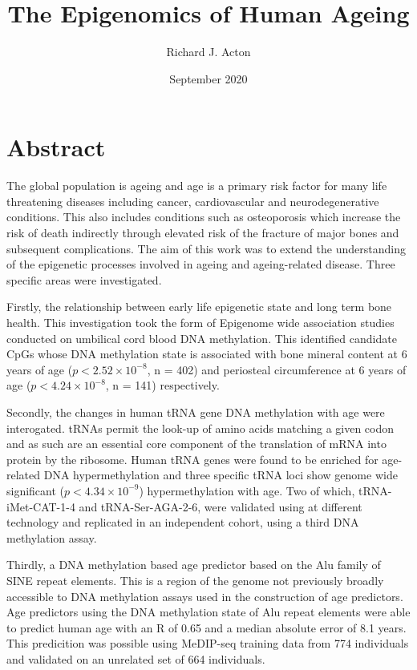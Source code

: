\documentclass[
]{book}
\title{\textbf{The Epigenomics of Human Ageing}}
\subtitle{\emph{\emph{University of Southampton}}

\textbf{Academic Unit:} Human Development and Health

A thesis for the degree of Doctor of Philosophy}
\author{Richard J. Acton}
\date{September 2020}
\begin{document}
\maketitle
\hypertarget{abstract}{%
\section*{Abstract}\label{abstract}}

The global population is ageing and age is a primary risk factor for many life threatening diseases including cancer, cardiovascular and neurodegenerative conditions.
This also includes conditions such as osteoporosis which increase the risk of death indirectly through elevated risk of the fracture of major bones and subsequent complications.
The aim of this work was to extend the understanding of the epigenetic processes involved in ageing and ageing-related disease.
Three specific areas were investigated.

Firstly, the relationship between early life epigenetic state and long term bone health.
This investigation took the form of Epigenome wide association studies conducted on umbilical cord blood DNA methylation.
This identified candidate CpGs whose DNA methylation state is associated with bone mineral content at 6 years of age (\(p < 2.52\times 10^{-8}\), n = 402) and periosteal circumference at 6 years of age (\(p < 4.24\times 10^{-8}\), n = 141) respectively.

Secondly, the changes in human tRNA gene DNA methylation with age were interogated.
tRNAs permit the look-up of amino acids matching a given codon and as such are an essential core component of the translation of mRNA into protein by the ribosome.
Human tRNA genes were found to be enriched for age-related DNA hypermethylation and three specific tRNA loci show genome wide significant (\(p < 4.34\times10^{-9}\)) hypermethylation with age.
Two of which, tRNA-iMet-CAT-1-4 and tRNA-Ser-AGA-2-6, were validated using at different technology and replicated in an independent cohort, using a third DNA methylation assay.

Thirdly, a DNA methylation based age predictor based on the Alu family of SINE repeat elements.
This is a region of the genome not previously broadly accessible to DNA methylation assays used in the construction of age predictors.
Age predictors using the DNA methylation state of Alu repeat elements were able to predict human age with an R of 0.65 and a median absolute error of 8.1 years.
This predicition was possible using MeDIP-seq training data from 774 individuals and validated on an unrelated set of 664 individuals.
\end{document}
